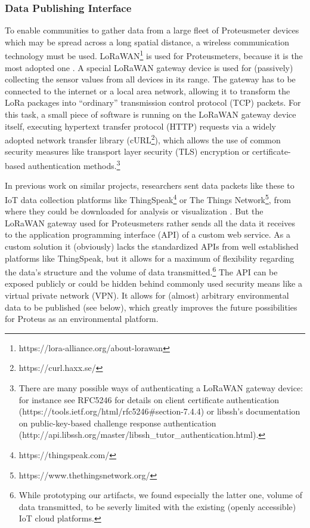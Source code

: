 \documentclass[11pt, letterpaper]{article}
\begin{document}
\subsubsection{Data Publishing Interface}
To enable communities to gather data from a large fleet of Proteusmeter devices which may be spread across a long spatial distance, a wireless communication technology must be used. LoRaWAN\footnote{https://lora-alliance.org/about-lorawan} is used for Proteusmeters, because it is the most adopted one \cite{adelantado2017understanding}. A special LoRaWAN gateway device is used for (passively) collecting the sensor values from all devices in its range. The gateway has to be connected to the internet or a local area network, allowing it to transform the LoRa packages into ``ordinary'' transmission control protocol (TCP) packets. For this task, a small piece of software is running on the LoRaWAN gateway device itself, executing hypertext transfer protocol (HTTP) requests via a widely adopted network transfer library (cURL\footnote{https://curl.haxx.se/}), which allows the use of common security measures like transport layer security (TLS) encryption or certificate-based authentication methods.\footnote{There are many possible ways of authenticating a LoRaWAN gateway device: for instance see RFC5246 for details on client certificate authentication (https://tools.ietf.org/html/rfc5246\#section-7.4.4) or libssh's documentation on public-key-based challenge response authentication (http://api.libssh.org/master/libssh\_tutor\_authentication.html).}
\newline

In previous work on similar projects, researchers sent data packets like these to IoT data collection platforms like ThingSpeak\footnote{https://thingspeak.com/} or The Things Network\footnote{https://www.thethingsnetwork.org/}, from where they could be downloaded for analysis or visualization \cite{deekshath2018iot, sivaiah2018internet}. But the LoRaWAN gateway used for Proteusmeters rather sends all the data it receives to the application programming interface (API) of a custom web service. As a custom solution it (obviously) lacks the standardized APIs from well established platforms like ThingSpeak, but it allows for a maximum of flexibility regarding the data's structure and the volume of data transmitted.\footnote{While prototyping our artifacts, we found especially the latter one, volume of data transmitted, to be severly limited with the existing (openly accessible) IoT cloud platforms.} The API can be exposed publicly or could be hidden behind commonly used security means like a virtual private network (VPN). It allows for (almost) arbitrary environmental data to be published (see below), which greatly improves the future possibilities for Proteus as an environmental platform.
\end{document}

